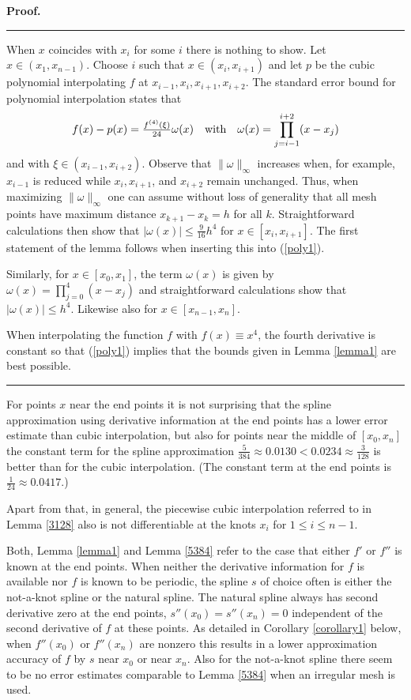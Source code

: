 \documentclass[12pt]{article}
\def\bee{\begin{equation}}
\def\ene{\end{equation}}
\def\mr#1{(\ref{#1})}
\newenvironment{proof}{\begin{list}{$\!\!${\bf Proof.}%
  \rule{1pt}{0pt}}{\setlength{\leftmargin}{0pt}%
  \setlength{\itemindent}{30pt}%
  \setlength{\listparindent}{15pt}}\item}{\rule{0.3em}{0mm}%
  \hfill\framebox[1.2ex]{\rule{0.3em}{0mm}}\end{list}}
\begin{document}
\begin{proof}
  When $x$ coincides with $x_i$ for some $i$ there is nothing to show.
  Let $x\in(x_1,x_{n-1})$. Choose $i$ such that $x\in(x_i,x_{i+1})$ and
  let $p$ be the cubic polynomial interpolating $f$ at
  $x_{i-1},x_i,x_{i+1},x_{i+2}$.
  The standard error bound
  for polynomial interpolation states that
  \bee\label{poly1}
  f(x)-p(x)=\tfrac{f^{(4)}(\xi)}{24} \omega(x) \quad\hbox{with}
  \quad \omega(x) = \prod_{j=i-1}^{i+2}(x-x_j)
  \ene
  and with $\xi\in (x_{i-1},x_{i+2})$.
  Observe that $\|\omega\|_\infty$ increases when, for example,
  $x_{i-1}$ is reduced while $x_i, x_{i+1}$, and $x_{i+2}$ remain
  unchanged. Thus, when maximizing $\|\omega\|_\infty$ one can
  assume without loss of generality that all mesh points have
  maximum distance $x_{k+1}-x_k = h$ for all $k$.
  Straightforward calculations then show that
  $|\omega(x)|\le \tfrac 9{16}h^4$
  for $x\in [x_i,x_{i+1}]$.
  The first statement of the 
  lemma follows when inserting this into \mr{poly1}.

  Similarly, for $x\in [x_0,x_{1}]$, the term $\omega(x)$ is given by
  $\omega(x)= \prod_{j=0}^{4}(x-x_j)$ and straightforward calculations show that
  $|\omega(x)|\le h^4$.
  Likewise also for $x\in[x_{n-1},x_n]$.

  When interpolating the function $f$ with $f(x)\equiv x^4$, the fourth derivative is constant
  so that \mr{poly1} implies that the bounds given in Lemma \ref{lemma1} are best possible.
\end{proof}

For points $x$ near the end points it is not surprising that
the spline approximation using derivative information
at the end points has a lower error estimate than cubic interpolation,
but also for points near the middle of $[x_0,x_n]$
the constant term for the spline approximation
$\tfrac{5}{384}\approx 0.0130 <  0.0234 \approx \tfrac{3}{128}$
is better than for the cubic interpolation. (The constant term
at the end points is $\tfrac{1}{24}\approx 0.0417$.)

Apart from that, in general,
the piecewise cubic interpolation referred to in Lemma \ref{3128}
also is not differentiable at the knots $x_i$ for $1\le i\le n-1$.




\bigskip






Both, Lemma \ref{lemma1} and Lemma \ref{5384} refer to the case
that either $f'$ or $f''$ is known at the end points.
When neither the derivative information for $f$ is available nor
$f$ is known to be periodic, the spline $s$ of choice often is either
the not-a-knot spline or the natural spline.
The natural spline always has second derivative zero at the end points,
$s''(x_0)=s''(x_n)=0$ independent of the second derivative of $f$
at these points. As detailed in Corollary \ref{corollary1} below,
when $f''(x_0)$ or $f''(x_n)$
are nonzero this results in a lower 
approximation accuracy of $f$ by $s$ near $x_0$ or near $x_n$.
Also for the not-a-knot spline there seem to be no error estimates
comparable to Lemma \ref{5384} when an irregular mesh is used.
\end{document}

